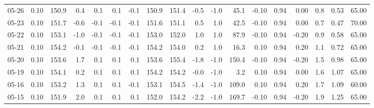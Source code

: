 \begin{threeparttable}
{\begin{tabular}{lrrrrrrrrrrrrrrrrr}
  05-26 &     0.10 & 150.9 &               0.4 &               0.1 &                0.1 &               -0.1 & 150.9 & 151.4 &       -0.5 &                     -1.0 &                45.1 &      -0.10 &      0.94 &           0.00 &              0.8 &            0.53 &                  65.00 \\
  05-23 &     0.10 & 151.7 &              -0.6 &              -0.1 &               -0.1 &               -0.1 & 151.6 & 151.1 &        0.5 &                      1.0 &                42.5 &      -0.10 &      0.94 &           0.00 &              0.7 &            0.47 &                  70.00 \\
  05-22 &     0.10 & 153.1 &              -1.0 &              -0.1 &               -0.1 &               -0.1 & 153.0 & 152.0 &        1.0 &                      1.0 &                87.9 &      -0.10 &      0.94 &          -0.20 &              0.9 &            0.58 &                  65.00 \\
  05-21 &     0.10 & 154.2 &              -0.1 &              -0.1 &               -0.1 &               -0.1 & 154.2 & 154.0 &        0.2 &                      1.0 &                16.3 &       0.10 &      0.94 &           0.20 &              1.1 &            0.72 &                  65.00 \\
  05-20 &     0.10 & 153.6 &               1.7 &               0.1 &                0.1 &                0.1 & 153.6 & 155.4 &       -1.8 &                     -1.0 &               150.4 &      -0.10 &      0.94 &          -0.20 &              1.5 &            0.98 &                  65.00 \\
  05-19 &     0.10 & 154.1 &               0.2 &               0.1 &                0.1 &                0.1 & 154.2 & 154.2 &       -0.0 &                     -1.0 &                 3.2 &       0.10 &      0.94 &           0.00 &              1.6 &            1.07 &                  65.00 \\
  05-16 &     0.10 & 153.2 &               1.3 &               0.1 &                0.1 &               -0.1 & 153.1 & 154.5 &       -1.4 &                     -1.0 &               109.0 &       0.10 &      0.94 &           0.20 &              1.7 &            1.09 &                  60.00 \\
  05-15 &     0.10 & 151.9 &               2.0 &               0.1 &                0.1 &                0.1 & 152.0 & 154.2 &       -2.2 &                     -1.0 &               169.7 &      -0.10 &      0.94 &          -0.20 &              1.9 &            1.25 &                  65.00 \\

\end{tabular}}
\end{threeparttable}
